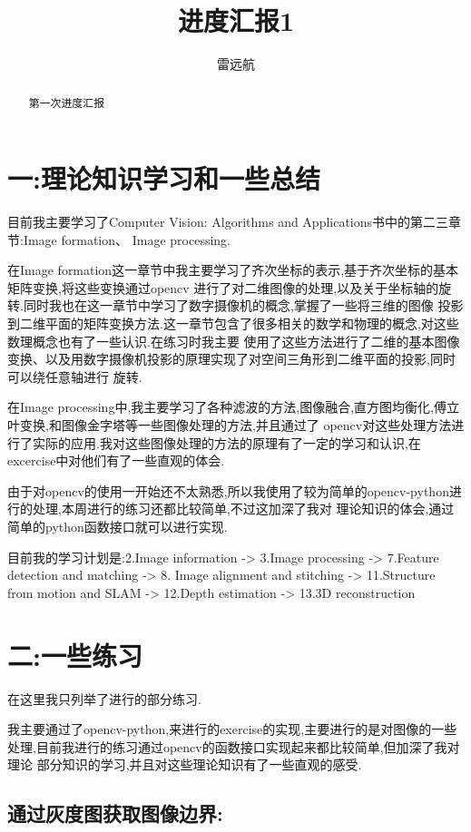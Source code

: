 \documentclass{article}
\title{进度汇报1}
\author{雷远航}
\begin{document}
\maketitle

\begin{abstract}
第一次进度汇报

\end{abstract}

\section*{一:理论知识学习和一些总结}
目前我主要学习了Computer Vision: Algorithms and Applications书中的第二三章节:Image formation、
Image processing.

在Image formation这一章节中我主要学习了齐次坐标的表示,基于齐次坐标的基本矩阵变换,将这些变换通过opencv
进行了对二维图像的处理,以及关于坐标轴的旋转.同时我也在这一章节中学习了数字摄像机的概念,掌握了一些将三维的图像
投影到二维平面的矩阵变换方法.这一章节包含了很多相关的数学和物理的概念,对这些数理概念也有了一些认识.在练习时我主要
使用了这些方法进行了二维的基本图像变换、以及用数字摄像机投影的原理实现了对空间三角形到二维平面的投影,同时可以绕任意轴进行
旋转.

在Image processing中,我主要学习了各种滤波的方法,图像融合,直方图均衡化,傅立叶变换,和图像金字塔等一些图像处理的方法,并且通过了
opencv对这些处理方法进行了实际的应用.我对这些图像处理的方法的原理有了一定的学习和认识,在excercise中对他们有了一些直观的体会.

由于对opencv的使用一开始还不太熟悉,所以我使用了较为简单的opencv-python进行的处理,本周进行的练习还都比较简单,不过这加深了我对
理论知识的体会,通过简单的python函数接口就可以进行实现.

目前我的学习计划是:2.Image information -> 3.Image processing -> 7.Feature detection and matching -> 8. Image alignment and stitching
-> 11.Structure from motion and SLAM -> 12.Depth estimation -> 13.3D reconstruction 

\section*{二:一些练习}
在这里我只列举了进行的部分练习.

我主要通过了opencv-python,来进行的exercise的实现,主要进行的是对图像的一些处理,目前我进行的练习通过opencv的函数接口实现起来都比较简单,但加深了我对理论
部分知识的学习,并且对这些理论知识有了一些直观的感受.

\subsection*{通过灰度图获取图像边界:}
\end{document}
